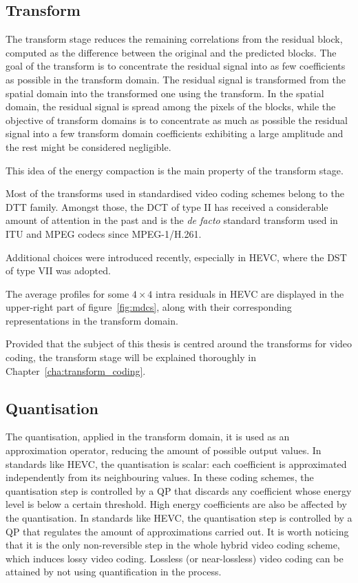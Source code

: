\documentclass[11pt,a4paper,openright,twoside]{book}
\numberwithin{equation}{section} %
\numberwithin{figure}{section} %
\numberwithin{table}{section} %
\begin{document}
\subsection{Transform}
\label{sub:transform}

The transform stage reduces the remaining correlations from the residual
block, computed as the difference between the original and the predicted
blocks.
The goal of the transform is to concentrate the residual signal into as few
coefficients as possible in the transform domain.
The residual signal is transformed from the spatial domain into the
transformed one using the transform.
In the spatial domain, the residual signal is spread among the pixels of the
blocks, while the objective of transform domains is to concentrate as much as
possible the residual signal into a few transform domain coefficients
exhibiting a large amplitude and the rest might be considered negligible.

This idea of the energy compaction is the main property of the transform
stage.

Most of the transforms used in standardised video coding schemes belong to the
\ac{DTT} family.
Amongst those, the \ac{DCT} of type II has received a considerable amount of
attention in the past and is the \emph{de facto} standard transform used in
\acs{ITU} and \acs{MPEG} codecs since \acs{MPEG}-1/H.261.

Additional choices were introduced recently, especially in \ac{HEVC}, where
the \ac{DST} of type VII was adopted.

The average profiles for some $4\times4$ intra residuals in \ac{HEVC} are
displayed in the upper-right part of figure~\ref{fig:mdcs}, along with their
corresponding representations in the transform domain.

Provided that the subject of this thesis is centred around the
transforms for video coding, the transform stage will be explained
thoroughly in Chapter~\ref{cha:transform_coding}.

\subsection{Quantisation}
\label{sub:quantisation}

The quantisation, applied in the transform domain, it is used as an
approximation operator, reducing the amount of possible output values.
In standards like \ac{HEVC}, the quantisation is scalar:
each coefficient is approximated independently from its neighbouring values.
In these coding schemes, the quantisation step is controlled by a \ac{QP} that
discards any coefficient whose energy level is below a certain threshold.
High energy coefficients are also be affected by the quantisation.
In standards like \acs{HEVC}, the quantisation step is controlled by a
\ac{QP} that regulates the amount of approximations carried out.
It is worth noticing that it is the only non-reversible step in the whole
hybrid video coding scheme, which induces lossy video coding.
Lossless (or near-lossless) video coding can be attained by not using
quantification in the process.
\end{document}
